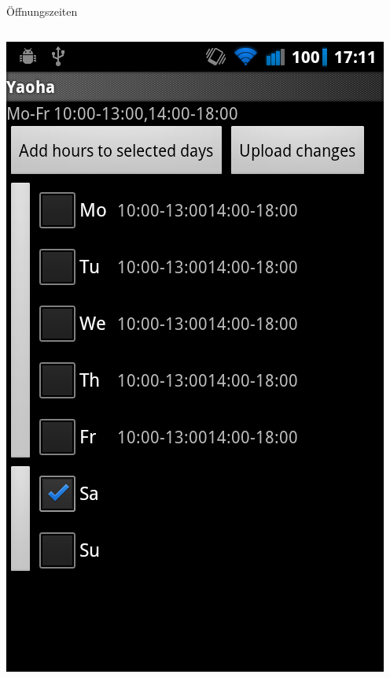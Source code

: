 \documentclass[hyperref]{beamer}
\begin{document}
\begin{frame}{\"Offnungszeiten}
	\begin{columns}
		\column{5.1cm}	    
	    \column{5cm}
    	\includegraphics[scale=0.25]{edit_opening_hours.png}
    \end{columns}
\end{frame}
\end{document}
